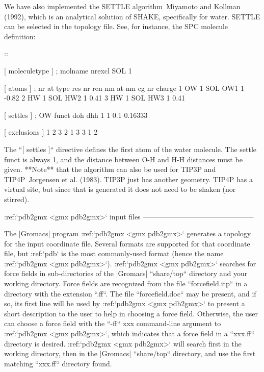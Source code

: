 We have also implemented the SETTLE
algorithm Miyamoto and Kollman (1992), which is an analytical solution
of SHAKE, specifically for water. SETTLE can be selected in the topology
file. See, for instance, the SPC molecule definition:

::

    [ moleculetype ]
    ; molname       nrexcl
    SOL             1

    [ atoms ]
    ; nr    at type res nr  ren nm  at nm   cg nr   charge
    1       OW      1       SOL     OW1     1       -0.82
    2       HW      1       SOL     HW2     1        0.41
    3       HW      1       SOL     HW3     1        0.41

    [ settles ]
    ; OW    funct   doh     dhh
    1       1       0.1     0.16333

    [ exclusions ]
    1       2       3
    2       1       3
    3       1       2

The ``[ settles ]`` directive defines the first atom of the
water molecule. The settle funct is always 1, and the distance between
O-H and H-H distances must be given. **Note** that the algorithm can
also be used for TIP3P and TIP4P Jorgensen et al. (1983). TIP3P just has
another geometry. TIP4P has a virtual site, but since that is generated
it does not need to be shaken (nor stirred).

:ref:`pdb2gmx <gmx pdb2gmx>` input files
-----------------------------------------------

The |Gromacs| program :ref:`pdb2gmx <gmx pdb2gmx>` generates a topology for the
input coordinate file. Several formats are supported for that coordinate
file, but :ref:`pdb` is the most commonly-used format (hence
the name :ref:`pdb2gmx <gmx pdb2gmx>`). :ref:`pdb2gmx <gmx pdb2gmx>` searches for
force fields in sub-directories of the |Gromacs| ``share/top``
directory and your working directory. Force fields are recognized from
the file ``forcefield.itp`` in a directory with the
extension ``.ff``. The file ``forcefield.doc``
may be present, and if so, its first line will be used by
:ref:`pdb2gmx <gmx pdb2gmx>` to present a short description to the user to
help in choosing a force field. Otherwise, the user can choose a force
field with the ``-ff`` xxx command-line argument to
:ref:`pdb2gmx <gmx pdb2gmx>`, which indicates that a force field in a
``xxx.ff`` directory is desired. :ref:`pdb2gmx <gmx pdb2gmx>`
will search first in the working directory, then in the |Gromacs|
``share/top`` directory, and use the first matching
``xxx.ff`` directory found.

